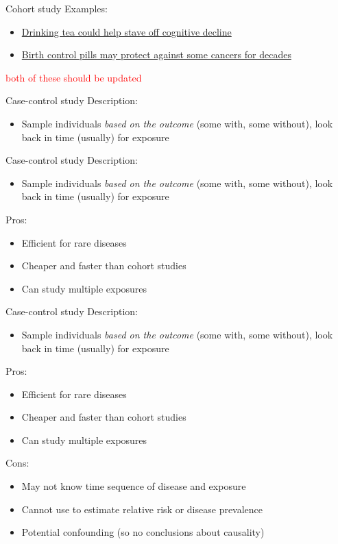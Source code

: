 \documentclass[10pt,t]{beamer}
\begin{document}
\begin{frame}[c]{Cohort study}
Examples:
\vspace{0.3cm}

\begin{itemize}
	\item \href{https://www.medicalnewstoday.com/articles/316619.php}{\color{cyan} Drinking tea could help stave off cognitive decline}
	\item \href{https://www.medicalnewstoday.com/articles/316565.php}{\color{cyan} Birth control pills may protect against some cancers for decades}
\end{itemize}

\textcolor{red}{both of these should be updated}

\end{frame}

\begin{frame}{Case-control study}
Description:
\begin{itemize}
	\item Sample individuals \textit{based on the outcome} (some with, some without), look back in time (usually) for exposure
\end{itemize}
\end{frame}

\begin{frame}{Case-control study}
Description:
\begin{itemize}
	\item Sample individuals \textit{based on the outcome} (some with, some without), look back in time (usually) for exposure
\end{itemize}
Pros:
\begin{itemize}
	\item Efficient for rare diseases
	\item Cheaper and faster than cohort studies
	\item Can study multiple exposures
\end{itemize}
\end{frame}

\begin{frame}{Case-control study}
Description:
\begin{itemize}
	\item Sample individuals \textit{based on the outcome} (some with, some without), look back in time (usually) for exposure
\end{itemize}
Pros:
\begin{itemize}
	\item Efficient for rare diseases
	\item Cheaper and faster than cohort studies
	\item Can study multiple exposures
\end{itemize}
Cons:
\begin{itemize}
	\item May not know time sequence of disease and exposure
	\item Cannot use to estimate relative risk or disease prevalence %
	\item Potential confounding (so no conclusions about causality)
\end{itemize}
\end{frame}
\end{document}
